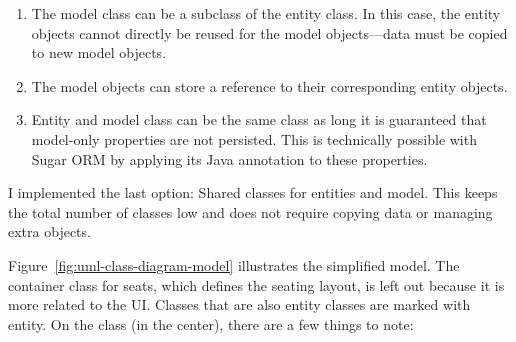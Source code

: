 \begin{enumerate}

  \item The model class can be a subclass of the entity class.
    In this case, the entity objects cannot directly be reused for the model
    objects---data must be copied to new model objects.

  \item The model objects can store a reference to their corresponding entity
    objects.

  \item Entity and model class can be the same class as long it is guaranteed
    that model-only properties are not persisted.
    This is technically possible with Sugar ORM by applying its Java annotation
     to these properties.

\end{enumerate}

I implemented the last option: Shared classes for entities and model.
This keeps the total number of classes low and does not require copying data or
managing extra objects.

Figure~\ref{fig:uml-class-diagram-model} illustrates the simplified model.
The container class for seats, which defines the seating layout, is left out
because it is more related to the \acs{UI}.
Classes that are also entity classes are marked with \flqq{}entity\frqq.
On the class  (in the center), there are a few things to note:

